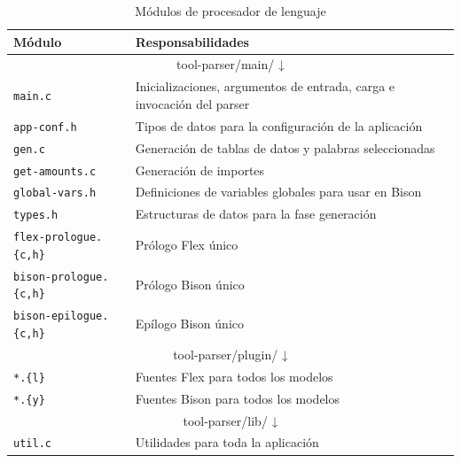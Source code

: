\begin{table}[ht]
    \centering
    \begin{tabular}{l l}
        Módulo & Responsabilidades \\
        \hline
        \hline
        \multicolumn{2}{c}{tool-parser/main/ ↓} \\
        \hline    
        \verb|main.c| & Inicializaciones, argumentos de entrada, carga e invocación del parser \\
        \verb|app-conf.h| & Tipos de datos para la configuración de la aplicación \\
        \verb|gen.c| & Generación de tablas de datos y palabras seleccionadas \\
        \verb|get-amounts.c| & Generación de importes \\
        \verb|global-vars.h| & Definiciones de variables globales para usar en Bison \\
        \verb|types.h| & Estructuras de datos para la fase generación \\
        \verb|flex-prologue.{c,h}| & Prólogo Flex único \\
        \verb|bison-prologue.{c,h}| & Prólogo Bison único \\
        \verb|bison-epilogue.{c,h}| & Epílogo Bison único \\
        \hline
        \multicolumn{2}{c}{tool-parser/plugin/ ↓} \\            
        \hline        
        \verb|*.{l}| & Fuentes Flex para todos los modelos \\
        \verb|*.{y}| & Fuentes Bison para todos los modelos \\
        \hline
        \multicolumn{2}{c}{tool-parser/lib/ ↓} \\     
        \hline
        \verb|util.c| & Utilidades para toda la aplicación \\
    \end{tabular}
    \caption{Módulos de procesador de lenguaje}    
    \label{tab:modulos-procesador-lenguaje}
\end{table}







